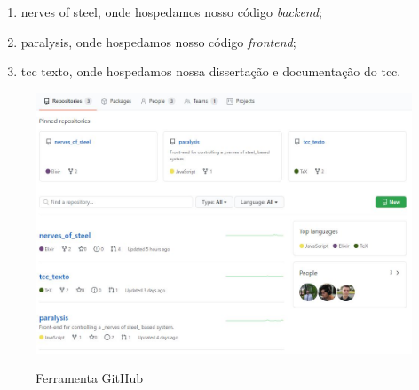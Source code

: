 \documentclass[../../layout.tex]{subfiles}
\begin{document}
\begin{enumerate}[label=\alph*)]
\itemsep0em
    \item nerves of steel, onde hospedamos nosso código \emph{backend};
    \item paralysis, onde hospedamos nosso código \emph{frontend};
    \item tcc texto, onde hospedamos nossa dissertação e documentação do tcc.
\end{enumerate}

\begin{figure}[H]
\centering
\caption{Ferramenta GitHub}
\includegraphics[width=1\textwidth]{assets/static/img/git.jpg}
\label{fig:i2c_structure}

\begin{minipage}{0.5\textwidth}
\end{minipage}
\end{figure}
\end{document}
